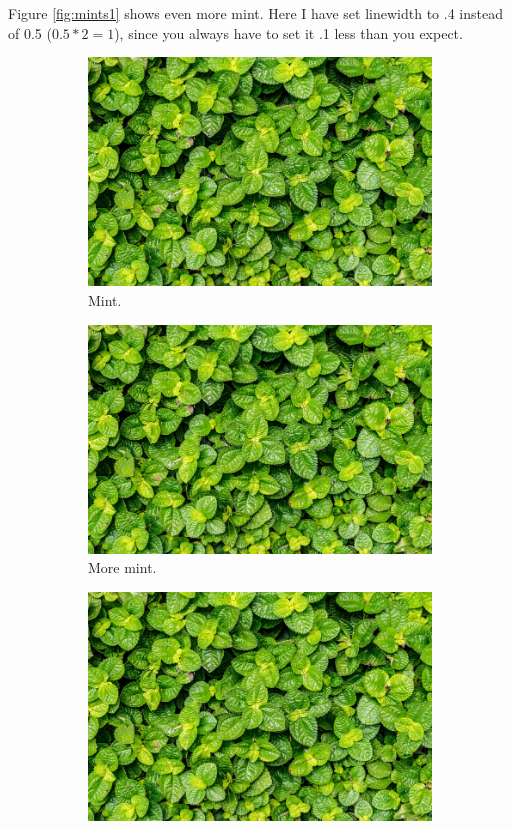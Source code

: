\documentclass{book}
\begin{document}
Figure \ref{fig:mints1} shows even more mint. Here I have set linewidth to .4 instead of 0.5 ($0.5 * 2 = 1$), since you always have to set it .1 less than you expect.

\begin{figure}[ht!]
  \centering
  \begin{subfigure}[b]{0.2\linewidth}
    \includegraphics[width=\linewidth]{mint.jpg}
     \caption{Mint.}
  \end{subfigure}
  \begin{subfigure}[b]{0.2\linewidth}
    \includegraphics[width=\linewidth]{mint.jpg}
    \caption{More mint.}
  \end{subfigure}
  \begin{subfigure}[b]{0.2\linewidth}
    \includegraphics[width=\linewidth]{mint.jpg}

\end{subfigure}
\end{figure}
\end{document}
